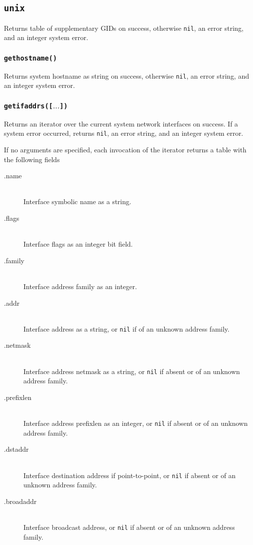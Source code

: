 \documentclass[11pt, oneside]{memoir}
\newcommand*{\nil}[0]{\texttt{nil}\xspace}
\newcommand*{\fn}[1]{\texttt{#1}\xspace}
\newcounter{toccols}
\newenvironment{Module}[1]{
	\subsection{\texttt{#1}}
	\addtocontents{toc}{
		\protect\begin{multicols}{\value{toccols}}
	}
}{
	\addtocontents{toc}{\protect\end{multicols}}
}
\begin{document}
\begin{Module}{unix}
Returns table of supplementary GIDs on success, otherwise \nil, an error string, and an integer system error.

\subsubsection[\fn{gethostname}]{\fn{gethostname()}}

Returns system hostname as string on success, otherwise \nil, an error string, and an integer system error.

\subsubsection[\fn{getifaddrs}]{\fn{getifaddrs([$\ldots$])}}

Returns an iterator over the current system network interfaces on success. If a system error occurred, returns \nil, an error string, and an integer system error.

If no arguments are specified, each invocation of the iterator returns a table with the following fields

\begin{description}
\item[.name] \hfill \\
Interface symbolic name as a string.
\item[.flags] \hfill \\
Interface flags as an integer bit field.
\item[.family] \hfill \\
Interface address family as an integer.
\item[.addr] \hfill \\
Interface address as a string, or \nil if of an unknown address family.
\item[.netmask] \hfill \\
Interface address netmask as a string, or \nil if absent or of an unknown address family.
\item[.prefixlen] \hfill \\
Interface address prefixlen as an integer, or \nil if absent or of an unknown address family.
\item[.dstaddr] \hfill \\
Interface destination address if point-to-point, or \nil if absent or of an unknown address family.
\item[.broadaddr] \hfill \\
Interface broadcast address, or \nil if absent or of an unknown address family.
\end{description}


\end{Module}
\end{document}
